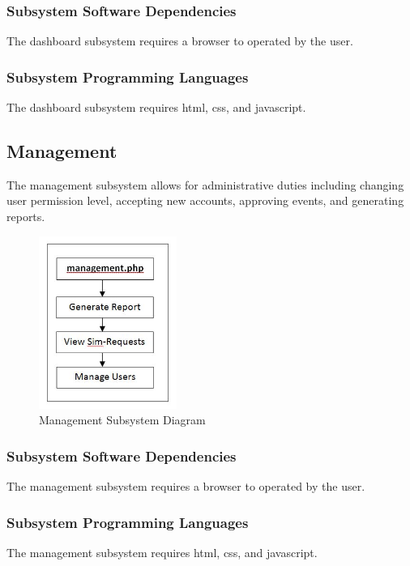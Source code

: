 \subsubsection{Subsystem Software Dependencies}
The dashboard subsystem requires a browser to operated by the user.

\subsubsection{Subsystem Programming Languages}
The dashboard subsystem requires html, css, and javascript.


\subsection{Management}
The management subsystem allows for administrative duties including changing user permission level, accepting new accounts, approving events, and generating reports.

\begin{figure}[h!]
	\centering
 	\includegraphics[width=0.40\textwidth]{images/management}
 \caption{Management Subsystem Diagram}
\end{figure}


\subsubsection{Subsystem Software Dependencies}
The management subsystem requires a browser to operated by the user.

\subsubsection{Subsystem Programming Languages}
The management subsystem requires html, css, and javascript.




